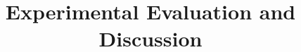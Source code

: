 \documentclass[11pt]{article}
\begin{document}
\title{Experimental Evaluation and Discussion}
\author{}\date{}\maketitle


\end{document}
